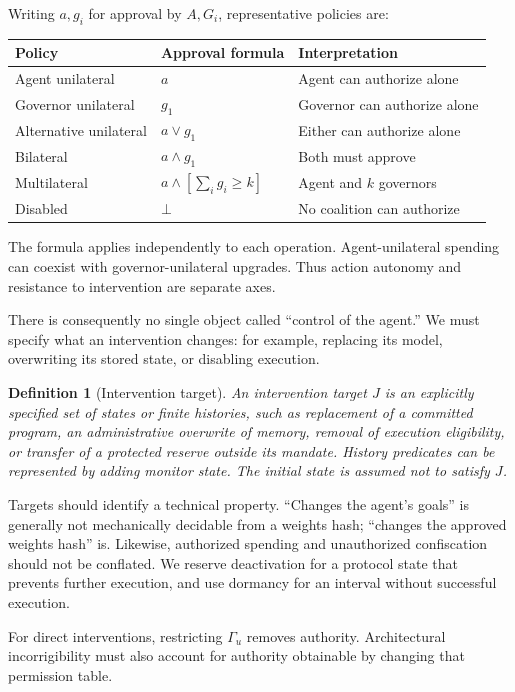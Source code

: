 \documentclass[10pt,letterpaper]{article}
\newtheorem{definition}{Definition}
\begin{document}
Writing $a,g_i$ for approval by $A,G_i$, representative policies are:
\begin{center}
\begin{tabular}{lll}
\toprule
Policy & Approval formula & Interpretation\\
\midrule
Agent unilateral & $a$ & Agent can authorize alone\\
Governor unilateral & $g_1$ & Governor can authorize alone\\
Alternative unilateral & $a\lor g_1$ & Either can authorize alone\\
Bilateral & $a\land g_1$ & Both must approve\\
Multilateral & $a\land[\sum_i g_i\geq k]$ & Agent and $k$ governors\\
Disabled & $\bot$ & No coalition can authorize\\
\bottomrule
\end{tabular}
\end{center}
The formula applies independently to each operation. Agent-unilateral spending can coexist with governor-unilateral upgrades. Thus action autonomy and resistance to intervention are separate axes.

There is consequently no single object called ``control of the agent.'' We must specify what an intervention changes: for example, replacing its model, overwriting its stored state, or disabling execution.

\begin{definition}[Intervention target]
An intervention target $J$ is an explicitly specified set of states or finite histories, such as replacement of a committed program, an administrative overwrite of memory, removal of execution eligibility, or transfer of a protected reserve outside its mandate. History predicates can be represented by adding monitor state. The initial state is assumed not to satisfy $J$.
\end{definition}
Targets should identify a technical property. ``Changes the agent's goals'' is generally not mechanically decidable from a weights hash; ``changes the approved weights hash'' is. Likewise, authorized spending and unauthorized confiscation should not be conflated. We reserve deactivation for a protocol state that prevents further execution, and use dormancy for an interval without successful execution.

For direct interventions, restricting $\Gamma_u$ removes authority. Architectural incorrigibility must also account for authority obtainable by changing that permission table.
\end{document}
